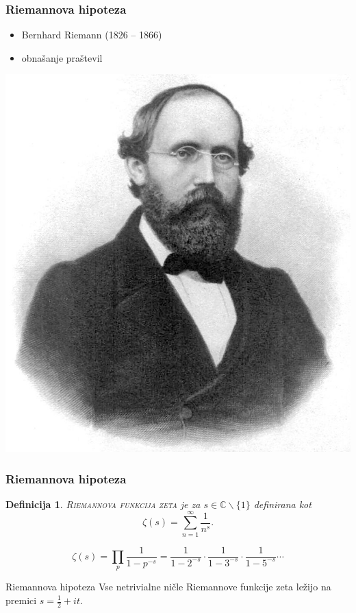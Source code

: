 \documentclass{beamer}
\newtheorem{definicija}{Definicija}
\newcommand{\pojem}[1]{\textsc{#1}}
\begin{document}
\begin{frame}
\frametitle{Riemannova hipoteza}

\begin{itemize}
\item Bernhard Riemann (1826 -- 1866)
\item obnašanje praštevil
\end{itemize}

\begin{center}
\includegraphics[scale=0.2]{riemann.png}
\end{center}

\end{frame}


\begin{frame}
\frametitle{Riemannova hipoteza}

\begin{definicija}
\pojem{Riemannova funkcija zeta} je za
 $s\in\mathbb{C}\backslash\{1\}$
definirana kot
\[ \zeta(s) = \sum_{n=1}^{\infty}\frac{1}{n^s}. \]
\end{definicija}

\[ \zeta(s) = \prod_{p}\frac{1}{1-p^{-s}}=\frac{1}{1-2^{-s}}\cdot\frac{1}{1-3^{-s}}\cdot\frac{1}{1-5^{-s}}\cdots \]

\pause
\begin{block}{Riemannova hipoteza}
Vse netrivialne ničle Riemannove funkcije zeta ležijo na premici $s=\frac{1}{2}+it$.
\end{block}

\end{frame}
\end{document}
